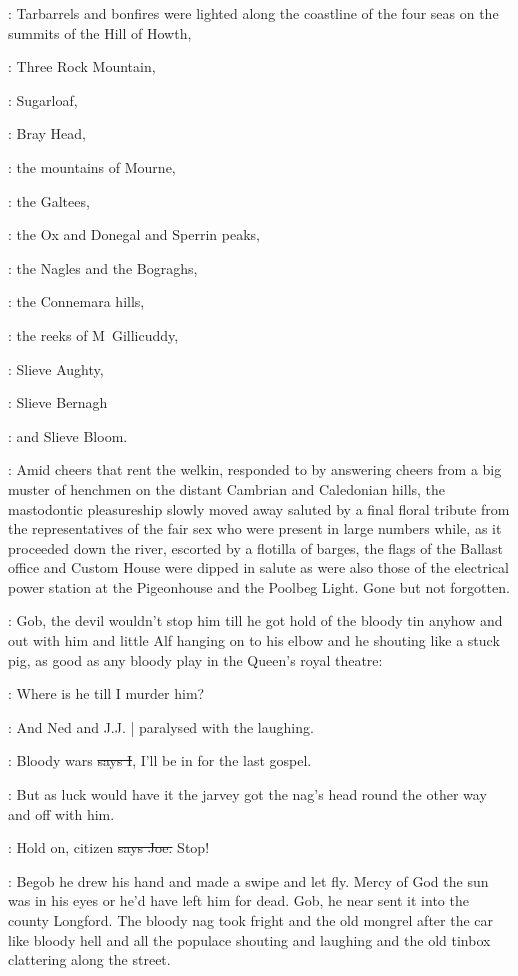 :
Tarbarrels and bonfires were lighted along the coastline
of the four seas on the summits of the Hill of Howth,

:
Three Rock Mountain,

:
Sugarloaf,

:
Bray Head,

:
the mountains of Mourne,

:
the Galtees,

:
the Ox and Donegal and Sperrin peaks,

:
the Nagles and the Bograghs,

:
the Connemara hills,

:
the reeks of M~Gillicuddy,

:
Slieve Aughty,

:
Slieve Bernagh

:
and Slieve Bloom.

:
Amid cheers that rent the welkin,
responded to by answering cheers from a big
muster of henchmen on the distant Cambrian and Caledonian hills,
the mastodontic pleasureship slowly moved away saluted by a final floral
tribute from the representatives of the fair sex who were present in large
numbers while,
as it proceeded down the river,
escorted by a flotilla of barges,
the flags of the Ballast office and Custom House were dipped in
salute as were also those of the electrical power station at the
Pigeonhouse and the Poolbeg Light.
Gone but not forgotten.

\Nq:
Gob,
the devil wouldn't stop him till he got hold of the bloody tin
anyhow and out with him and little Alf hanging on to his elbow and he
shouting like a stuck pig,
as good as any bloody play in the Queen's royal theatre:

\citizen:
Where is he till I murder him?

\Nq:
And Ned and J.J. |
paralysed with the laughing.

:
Bloody wars
\sout{says I},
I'll be in for the last gospel.

\Nq:
But as luck would have it
the jarvey got the nag's head round the
other way and off with him.

\joe:
Hold on,
citizen
\sout{says Joe.}
Stop!

\Nq:
Begob he drew his hand and made a swipe and let fly.
Mercy of God the sun was in his eyes or he'd have left him for dead.
Gob,
he near sent it into the county Longford.
The bloody nag took fright
and the old mongrel
after the car like bloody hell and all the populace shouting and laughing
and the old tinbox clattering along the street.

